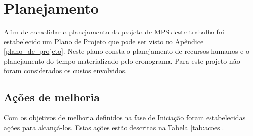 \chapter{Planejamento} \label{cap:planejamento}

Afim de consolidar o planejamento do projeto de MPS deste trabalho foi estabelecido um Plano de Projeto que pode ser visto no
Apêndice \ref{plano_de_projeto}. Neste plano consta o planejamento de recursos humanos e o planejamento do tempo materializado
pelo cronograma. Para este projeto não foram considerados os custos envolvidos. 

\section{Ações de melhoria}

Com os objetivos de melhoria definidos na fase de Iniciação foram estabelecidas ações para alcançá-los. Estas ações estão 
descritas na Tabela \ref{tab:acoes}.


